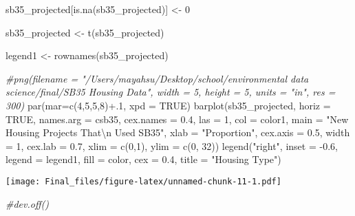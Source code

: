 \documentclass[
]{article}
\newenvironment{Shaded}{\begin{snugshade}}{\end{snugshade}}
\newcommand{\AttributeTok}[1]{\textcolor[rgb]{0.77,0.63,0.00}{#1}}
\newcommand{\CommentTok}[1]{\textcolor[rgb]{0.56,0.35,0.01}{\textit{#1}}}
\newcommand{\ConstantTok}[1]{\textcolor[rgb]{0.00,0.00,0.00}{#1}}
\newcommand{\DecValTok}[1]{\textcolor[rgb]{0.00,0.00,0.81}{#1}}
\newcommand{\FloatTok}[1]{\textcolor[rgb]{0.00,0.00,0.81}{#1}}
\newcommand{\FunctionTok}[1]{\textcolor[rgb]{0.00,0.00,0.00}{#1}}
\newcommand{\NormalTok}[1]{#1}
\newcommand{\OtherTok}[1]{\textcolor[rgb]{0.56,0.35,0.01}{#1}}
\newcommand{\SpecialCharTok}[1]{\textcolor[rgb]{0.00,0.00,0.00}{#1}}
\newcommand{\StringTok}[1]{\textcolor[rgb]{0.31,0.60,0.02}{#1}}
\begin{document}
\begin{Shaded}
\begin{Highlighting}[]
\NormalTok{sb35\_projected[}\FunctionTok{is.na}\NormalTok{(sb35\_projected)] }\OtherTok{\textless{}{-}} \DecValTok{0}

\NormalTok{sb35\_projected }\OtherTok{\textless{}{-}} \FunctionTok{t}\NormalTok{(sb35\_projected)}

\NormalTok{legend1 }\OtherTok{\textless{}{-}} \FunctionTok{rownames}\NormalTok{(sb35\_projected)}

\CommentTok{\#png(filename = "/Users/mayahsu/Desktop/school/environmental data science/final/SB35 Housing Data", width = 5, height = 5, units = "in", res = 300)}
\FunctionTok{par}\NormalTok{(}\AttributeTok{mar=}\FunctionTok{c}\NormalTok{(}\DecValTok{4}\NormalTok{,}\DecValTok{5}\NormalTok{,}\DecValTok{5}\NormalTok{,}\DecValTok{8}\NormalTok{)}\SpecialCharTok{+}\NormalTok{.}\DecValTok{1}\NormalTok{, }\AttributeTok{xpd =} \ConstantTok{TRUE}\NormalTok{)}
\FunctionTok{barplot}\NormalTok{(sb35\_projected, }\AttributeTok{horiz =} \ConstantTok{TRUE}\NormalTok{, }\AttributeTok{names.arg =}\NormalTok{ csb35, }\AttributeTok{cex.names =} \FloatTok{0.4}\NormalTok{, }\AttributeTok{las =} \DecValTok{1}\NormalTok{, }\AttributeTok{col =}\NormalTok{ color1, }\AttributeTok{main =} \StringTok{"New Housing Projects That}\SpecialCharTok{\textbackslash{}n}\StringTok{ Used SB35"}\NormalTok{, }\AttributeTok{xlab =} \StringTok{"Proportion"}\NormalTok{, }\AttributeTok{cex.axis =} \FloatTok{0.5}\NormalTok{, }\AttributeTok{width =} \DecValTok{1}\NormalTok{, }\AttributeTok{cex.lab =} \FloatTok{0.7}\NormalTok{, }\AttributeTok{xlim =} \FunctionTok{c}\NormalTok{(}\DecValTok{0}\NormalTok{,}\DecValTok{1}\NormalTok{), }\AttributeTok{ylim =} \FunctionTok{c}\NormalTok{(}\DecValTok{0}\NormalTok{, }\DecValTok{32}\NormalTok{))}
\FunctionTok{legend}\NormalTok{(}\StringTok{"right"}\NormalTok{, }\AttributeTok{inset =} \SpecialCharTok{{-}}\FloatTok{0.6}\NormalTok{, }\AttributeTok{legend =}\NormalTok{ legend1, }\AttributeTok{fill =}\NormalTok{ color, }\AttributeTok{cex =} \FloatTok{0.4}\NormalTok{, }\AttributeTok{title =} \StringTok{"Housing Type"}\NormalTok{)}
\end{Highlighting}
\end{Shaded}

\texttt{[image: Final\_files/figure-latex/unnamed-chunk-11-1.pdf]}

\begin{Shaded}
\begin{Highlighting}[]
\CommentTok{\#dev.off()}
\end{Highlighting}
\end{Shaded}
\end{document}
